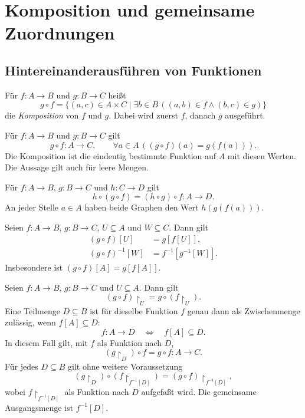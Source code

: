\chapter{Komposition und gemeinsame Zuordnungen}
\label{b05guide:ch:composition}

\section{Hintereinanderausführen von Funktionen}

\begin{definition}[Komposition]
\label{b05guide:def:composition}
Für $f\colon A\to B$ und $g\colon B\to C$ heißt
\[
 g\circ f
   =\{(a,c)\in A\times C\mid
       \exists b\in B\,((a,b)\in f\land(b,c)\in g)\}
\]
die \emph{Komposition} von $f$ und $g$.
Dabei wird zuerst $f$, danach $g$ ausgeführt.
\end{definition}

\begin{theorem}
\label{b05guide:thm:composition-value}
Für $f\colon A\to B$ und $g\colon B\to C$ gilt
\[
 g\circ f\colon A\to C,\qquad
 \forall a\in A\,((g\circ f)(a)=g(f(a))).
\]
Die Komposition ist die eindeutig bestimmte Funktion auf $A$
mit diesen Werten. Die Aussage gilt auch für leere Mengen.
\end{theorem}

\begin{theorem}[Assoziativität]
\label{b05guide:thm:composition-associativity}
Für $f\colon A\to B$, $g\colon B\to C$ und
$h\colon C\to D$ gilt
\[
 h\circ(g\circ f)=(h\circ g)\circ f\colon A\to D.
\]
An jeder Stelle $a\in A$ haben beide Graphen den Wert
$h(g(f(a)))$.
\end{theorem}

\begin{theorem}
\label{b05guide:thm:composition-images}
Seien $f\colon A\to B$, $g\colon B\to C$,
$U\subseteq A$ und $W\subseteq C$. Dann gilt
\[
 \begin{aligned}
 (g\circ f)[U]&=g[f[U]],\\
 (g\circ f)^{-1}[W]&=f^{-1}[g^{-1}[W]].
 \end{aligned}
\]
Insbesondere ist $(g\circ f)[A]=g[f[A]]$.
\end{theorem}

\begin{theorem}
\label{b05guide:thm:composition-restrictions}
Seien $f\colon A\to B$, $g\colon B\to C$ und
$U\subseteq A$. Dann gilt
\[
 (g\circ f)\restriction_U=g\circ(f\restriction_U).
\]
Eine Teilmenge $D\subseteq B$ ist für dieselbe Funktion $f$
genau dann als Zwischenmenge zulässig, wenn $f[A]\subseteq D$:
\[
 f\colon A\to D\quad\Longleftrightarrow\quad f[A]\subseteq D.
\]
In diesem Fall gilt, mit $f$ als Funktion nach $D$,
\[
 (g\restriction_D)\circ f=g\circ f\colon A\to C.
\]
Für jedes $D\subseteq B$ gilt ohne weitere Voraussetzung
\[
 (g\restriction_D)\circ(f\restriction_{f^{-1}[D]})
       =(g\circ f)\restriction_{f^{-1}[D]},
\]
wobei $f\restriction_{f^{-1}[D]}$ als Funktion nach $D$
aufgefaßt wird. Die gemeinsame Ausgangsmenge ist $f^{-1}[D]$.
\end{theorem}

